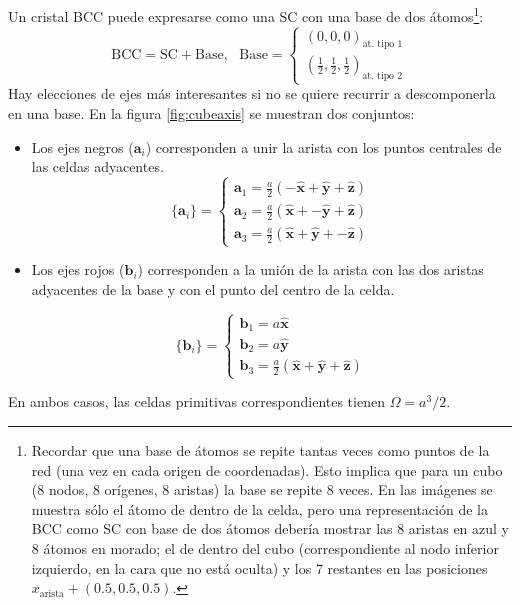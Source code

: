   Un cristal BCC puede expresarse como una SC con una base de dos
  átomos\footnote{Recordar que una base de átomos se repite tantas
    veces como puntos de la red (una vez en cada origen de
    coordenadas). Esto implica que para un cubo (8 nodos, 8 orígenes,
    8 aristas) la base se repite 8 veces. En las imágenes se muestra
    sólo el átomo de dentro de la celda, pero una representación de la
    BCC como SC con base de dos átomos debería mostrar las 8 aristas
    en azul y 8 átomos en morado; el de dentro del cubo
    (correspondiente al nodo inferior izquierdo, en la cara que no
    está oculta) y los 7 restantes en las posiciones
    $x _{\text{arista}} + (0.5,0.5,0.5)$.}:
\begin{equation}
  \text{BCC} = \text{SC} + \text{Base},\ \ \ \text{Base} =
  \begin{cases}
    (0,0,0)_{\text{at. tipo 1}} \\
    (\frac{1}{2},\frac{1}{2},\frac{1}{2})_{\text{at. tipo 2}}
  \end{cases}
\end{equation}
Hay elecciones de ejes más interesantes si no se quiere recurrir a
descomponerla en una base. En la figura \ref{fig:cubeaxis} se muestran
dos conjuntos:
\begin{itemize}
\item Los ejes negros ($\mathbf{a}_i$) corresponden a unir la
arista con los puntos centrales de las celdas adyacentes.
\begin{equation}
    \{\mathbf{a}_i\}  =
    \begin{cases}
      \mathbf{a}_1 =  \frac{a}{2} (-\hat{\mathbf{x}} + \hat{\mathbf{y}} +
      \hat{ \mathbf{z}} ) \\
      \mathbf{a}_2 =  \frac{a}{2} (\hat{\mathbf{x}} + -\hat{\mathbf{y}} +
      \hat{ \mathbf{z}} ) \\
      \mathbf{a}_3 = \frac{a}{2} (\hat{\mathbf{x}} + \hat{\mathbf{y}} +
      -\hat{ \mathbf{z}} )
    \end{cases}
\end{equation}
\item Los ejes rojos ($\mathbf{b}_i$) corresponden a la unión de la arista con
  las dos aristas adyacentes de la base y con el punto del centro de
  la celda.

\begin{equation}
    \{\mathbf{b}_{i}\} =
    \begin{cases}
      \mathbf{b}_1 = a \hat{\mathbf{x}} \\
      \mathbf{b}_2 = a \hat{\mathbf{y}} \\
      \mathbf{b}_3 = \frac{a}{2} (\hat{\mathbf{x}} + \hat{\mathbf{y}}
      + \hat{ \mathbf{z}} )
    \end{cases}
  \end{equation}
\end{itemize}
En ambos casos, las celdas primitivas correspondientes tienen
 $\Omega = a^3/2$.

